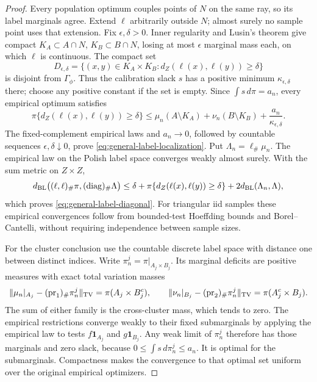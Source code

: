 \documentclass[11pt,reqno]{amsart}
\theoremstyle{definition}
\theoremstyle{remark}
\numberwithin{equation}{section}
\begin{document}
\begin{proof}
Every population optimum couples points of \(N\) on the same ray,
so its label marginals agree. Extend \(\ell\) arbitrarily outside
\(N\); almost surely no sample point uses that extension.
Fix \(\epsilon,\delta>0\). Inner regularity and Lusin's theorem
give compact \(K_A\subset A\cap N\), \(K_B\subset B\cap N\),
losing at most \(\epsilon\) marginal mass each, on which \(\ell\)
is continuous. The compact set
\[
D_{\epsilon,\delta}
=\{(x,y)\in K_A\times K_B:
                   d_Z(\ell(x),\ell(y))\ge\delta\}
\]
is disjoint from \(\Gamma_\phi\). Thus the calibration slack
\(s\) has a positive minimum \(\kappa_{\epsilon,\delta}\)
there; choose any positive constant if the set is empty. Since
\(\int s\,d\pi=a_n\), every empirical optimum satisfies
\begin{equation}
\label{eq:general-label-slack}
\pi\{d_Z(\ell(x),\ell(y))\ge\delta\}
\le\mu_n(A\setminus K_A)+\nu_n(B\setminus K_B)
   +\frac{a_n}{\kappa_{\epsilon,\delta}}.
\end{equation}
The fixed-complement empirical laws and \(a_n\to0\), followed by
countable sequences \(\epsilon,\delta\downarrow0\), prove
\eqref{eq:general-label-localization}. Put \(\Lambda_n=\ell_\#\mu_n\).
The empirical law on the Polish label space converges weakly almost
surely. With the sum metric on \(Z\times Z\),
\[
d_{\rm BL}\bigl((\ell,\ell)_\#\pi,
                   (\operatorname{diag})_\#\Lambda\bigr)
\le \delta+\pi\{d_Z(\ell(x),\ell(y))\ge\delta\}
       +2d_{\rm BL}(\Lambda_n,\Lambda),
\]
which proves \eqref{eq:general-label-diagonal}.
For triangular iid samples these empirical convergences follow from
bounded-test Hoeffding bounds and Borel--Cantelli, without requiring
independence between sample sizes.

For the cluster conclusion use the countable discrete label space
with distance one between distinct indices. Write
\(\pi_n^j=\pi|_{A_j\times B_j}\). Its marginal deficits are
positive measures with exact total variation masses
\[
\|\mu_n|_{A_j}-(\operatorname{pr}_1)_\#\pi_n^j\|_{\rm TV}
  =\pi(A_j\times B_j^c),\qquad
\|\nu_n|_{B_j}-(\operatorname{pr}_2)_\#\pi_n^j\|_{\rm TV}
  =\pi(A_j^c\times B_j).
\]
The sum of either family is the cross-cluster mass, which tends
to zero. The empirical restrictions converge weakly to their fixed
submarginals by applying the empirical law to tests
\(f\mathbf1_{A_j}\) and \(g\mathbf1_{B_j}\). Any weak limit of
\(\pi_n^j\) therefore has those marginals and zero slack, because
\(0\le\int s\,d\pi_n^j\le a_n\). It is optimal for the
submarginals. Compactness makes the convergence to that optimal set
uniform over the original empirical optimizers.
\end{proof}
\end{document}
